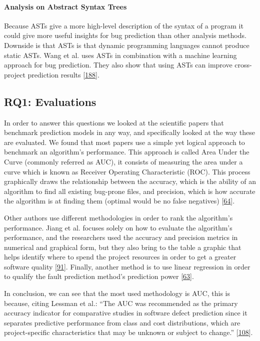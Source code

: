 \documentclass[]{book}
\let\oldparagraph\paragraph
\renewcommand{\paragraph}[1]{\oldparagraph{#1}\mbox{}}
\begin{document}
\paragraph{Analysis on Abstract Syntax
Trees}\label{analysis-on-abstract-syntax-trees}

Because ASTs give a more high-level description of the syntax of a
program it could give more useful insights for bug prediction than other
analysis methods. Downside is that ASTs is that dynamic programming
languages cannot produce static ASTs. Wang et al. uses ASTs in
combination with a machine learning approach for bug prediction. They
also show that using ASTs can improve cross-project prediction results
{[}\protect\hyperlink{ref-wang2016}{188}{]}.

\subsection{RQ1: Evaluations}\label{rq1-evaluations}

In order to answer this questions we looked at the scientific papers
that benchmark prediction models in any way, and specifically looked at
the way these are evaluated. We found that most papers use a simple yet
logical approach to benchmark an algorithm's performance. This approach
is called Area Under the Curve (commonly referred as AUC), it consists
of measuring the area under a curve which is known as Receiver Operating
Characteristic (ROC). This process graphically draws the relationship
between the accuracy, which is the ability of an algorithm to find all
existing bug-prone files, and precision, which is how accurate the
algorithm is at finding them (optimal would be no false negatives)
{[}\protect\hyperlink{ref-DAmbros2012}{64}{]}.

Other authors use different methodologies in order to rank the
algorithm's performance. Jiang et al. focuses solely on how to evaluate
the algorithm's performance, and the researchers used the accuracy and
precision metrics in numerical and graphical form, but they also bring
to the table a graphic that helps identify where to spend the project
resources in order to get a greater software quality
{[}\protect\hyperlink{ref-Jiang2008}{91}{]}. Finally, another method is
to use linear regression in order to qualify the fault prediction
method's prediction power {[}\protect\hyperlink{ref-DAmbros2010}{63}{]}.

In conclusion, we can see that the most used methodology is AUC, this is
because, citing Lessman et al.: ``The AUC was recommended as the primary
accuracy indicator for comparative studies in software defect prediction
since it separates predictive performance from class and cost
distributions, which are project-specific characteristics that may be
unknown or subject to change.''
{[}\protect\hyperlink{ref-Lessman2008}{108}{]}.
\end{document}
